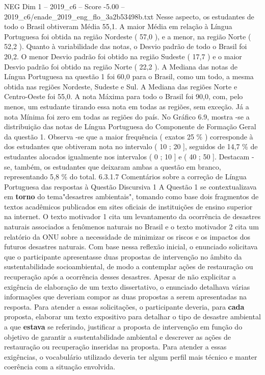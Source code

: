 \begin{textsample}{NEG Dim 1 – 2019\_c6 – Score -5.00 – 2019\_c6/enade\_2019\_eng\_flo\_3a2b53498b.txt}
Nesse aspecto, os estudantes de todo o Brasil obtiveram Média 55,1.
A maior Média em relação à Língua Portuguesa foi obtida na região Nordeste ( 57,0 ), e a menor, na região Norte ( 52,2 ).
Quanto à variabilidade das notas, o Desvio padrão de todo o Brasil foi 20,2.
O menor Desvio padrão foi obtido na região Sudeste ( 17,7 ) e o maior Desvio padrão foi obtido na região Norte ( 22,2 ).
A Mediana das notas de Língua Portuguesa na questão 1 foi 60,0 para o Brasil, como um todo, a mesma obtida nas regiões Nordeste, Sudeste e Sul.
A Mediana das regiões Norte e Centro-Oeste foi 55,0.
A nota Máxima para todo o Brasil foi 90,0, com, pelo menos, um estudante tirando essa nota em todas as regiões, sem exceção.
Já a nota Mínima foi zero em todas as regiões do país.
No Gráfico 6.9, mostra -se a distribuição das notas de Língua Portuguesa do Componente de Formação Geral da questão 1.
Observa -se que a maior frequência ( exatos 25 \% ) corresponde à dos estudantes que obtiveram nota no intervalo ( 10 ; 20 ], seguidos de 14,7 \% de estudantes alocados igualmente nos intervalos ( 0 ; 10 ] e ( 40 ; 50 ].
Destacam -se, também, os estudantes que deixaram ambas a questão em branco, representando 5,8 \% do total. 6.3.1.7 Comentários sobre a correção de Língua Portuguesa das respostas à Questão Discursiva 1 A Questão 1 se contextualizava em \textbf{torno} do tema"desastres ambientais", tomando como base dois fragmentos de textos acadêmicos publicados em sites oficiais de instituições de ensino superior na internet.
O texto motivador 1 cita um levantamento da ocorrência de desastres naturais associados a fenômenos naturais no Brasil e o texto motivador 2 cita um relatório da ONU sobre a necessidade de minimizar os riscos e os impactos dos futuros desastres naturais.
Com base nessa reflexão inicial, o enunciado solicitava que o participante apresentasse duas propostas de intervenção no âmbito da sustentabilidade socioambiental, de modo a contemplar ações de restauração ou recuperação após a ocorrência desses desastres.
Apesar de não explicitar a exigência de elaboração de um texto dissertativo, o enunciado detalhava várias informações que deveriam compor as duas propostas a serem apresentadas na resposta.
Para atender a essas solicitações, o participante deveria, para \textbf{cada} proposta, elaborar um texto expositivo para detalhar o tipo de desastre ambiental a que \textbf{estava} se referindo, justificar a proposta de intervenção em função do objetivo de garantir a sustentabilidade ambiental e descrever as ações de restauração ou recuperação inseridas na proposta.
Para atender a essas exigências, o vocabulário utilizado deveria ter algum perfil mais técnico e manter coerência com a situação envolvida.

\end{textsample}
